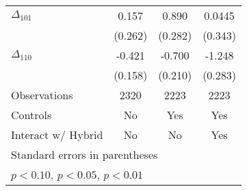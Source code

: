 {\begin{tabular}{l*{3}{c}}
$\Delta_{101}$&    0.157         &    0.890\sym{***}&   0.0445         \\
          &  (0.262)         &  (0.282)         &  (0.343)         \\
$\Delta_{110}$&   -0.421\sym{***}&   -0.700\sym{***}&   -1.248\sym{***}\\
          &  (0.158)         &  (0.210)         &  (0.283)         \\
\hline
Observations&     2320         &     2223         &     2223         \\
Controls  &       No         &      Yes         &      Yes         \\
Interact w/ Hybrid&       No         &       No         &      Yes         \\
\hline\hline
\multicolumn{4}{l}{\footnotesize Standard errors in parentheses}\\
\multicolumn{4}{l}{\footnotesize \sym{*} \(p<0.10\), \sym{**} \(p<0.05\), \sym{***} \(p<0.01\)}\\
\end{tabular}
}
